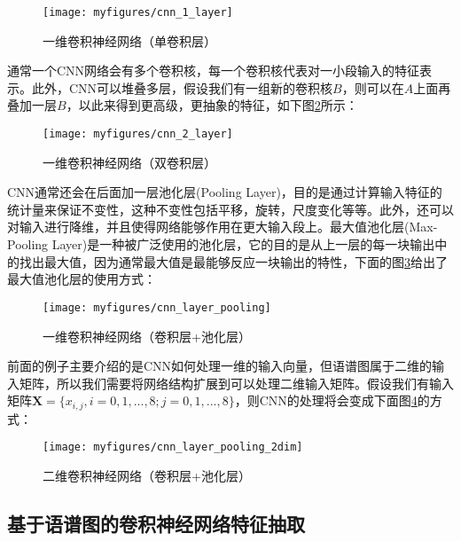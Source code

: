 \begin{figure}[htb] %
    \centering
    \texttt{[image: myfigures/cnn\_1\_layer]}
    \caption{一维卷积神经网络（单卷积层）}
    \label{fig:cnn_1_layer}
\end{figure}

通常一个CNN网络会有多个卷积核，每一个卷积核代表对一小段输入的特征表示。此外，CNN可以堆叠多层，假设我们有一组新的卷积核$B$，则可以在$A$上面再叠加一层$B$，以此来得到更高级，更抽象的特征，如下图\ref{fig:cnn_2_layer}所示：

\begin{figure}[htb] %
    \centering
    \texttt{[image: myfigures/cnn\_2\_layer]}
    \caption{一维卷积神经网络（双卷积层）}
    \label{fig:cnn_2_layer}
\end{figure}

CNN通常还会在后面加一层池化层(Pooling Layer)，目的是通过计算输入特征的统计量来保证不变性，这种不变性包括平移，旋转，尺度变化等等。此外，还可以对输入进行降维，并且使得网络能够作用在更大输入段上。最大值池化层(Max-Pooling Layer)是一种被广泛使用的池化层，它的目的是从上一层的每一块输出中的找出最大值，因为通常最大值是最能够反应一块输出的特性，下面的图\ref{fig:cnn_layer_pooling}给出了最大值池化层的使用方式：

\begin{figure}[htb] %
    \centering
    \texttt{[image: myfigures/cnn\_layer\_pooling]}
    \caption{一维卷积神经网络（卷积层+池化层）}
    \label{fig:cnn_layer_pooling}
\end{figure}

前面的例子主要介绍的是CNN如何处理一维的输入向量，但语谱图属于二维的输入矩阵，所以我们需要将网络结构扩展到可以处理二维输入矩阵。假设我们有输入矩阵$\mathbf{X}=\{x_{i,j}, i=0,1,...,8; j=0,1,...,8\}$，则CNN的处理将会变成下面图\ref{fig:cnn_layer_pooling_2dim}的方式：

\begin{figure}[htb] %
    \centering
    \texttt{[image: myfigures/cnn\_layer\_pooling\_2dim]}
    \caption{二维卷积神经网络（卷积层+池化层）}
    \label{fig:cnn_layer_pooling_2dim}
\end{figure}

\subsection{基于语谱图的卷积神经网络特征抽取}
\label{ssec:cnn_spectrogram_feature_extract}

